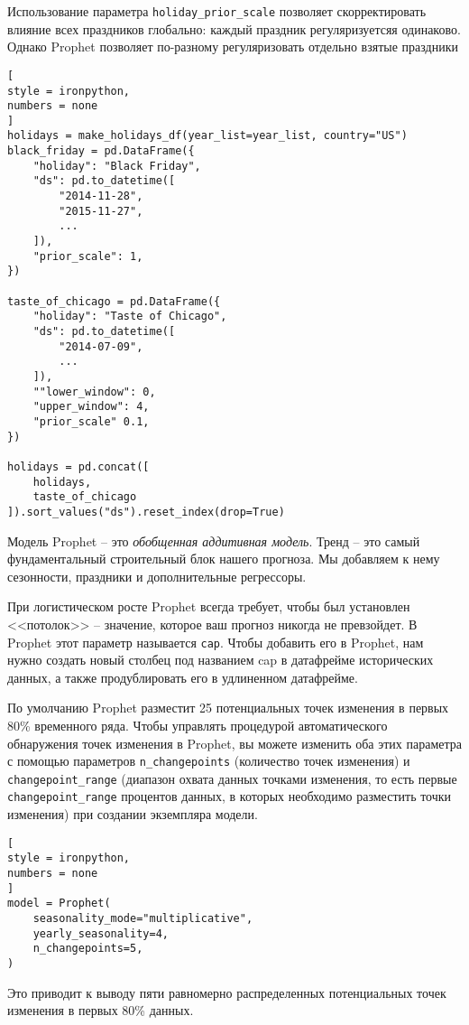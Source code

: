 \documentclass[%
	11pt,
	a4paper,
	utf8,
		]{article}
\begin{document}
Использование параметра \verb|holiday_prior_scale| позволяет скорректировать влияние всех праздников глобально: каждый праздник регуляризуетсяя одинаково. Однако Prophet позволяет по-разному регуляризовать отдельно взятые праздники
\begin{lstlisting}[
style = ironpython,
numbers = none
]
holidays = make_holidays_df(year_list=year_list, country="US")
black_friday = pd.DataFrame({
    "holiday": "Black Friday",
    "ds": pd.to_datetime([
        "2014-11-28",
        "2015-11-27",
        ...
    ]),
    "prior_scale": 1,
})

taste_of_chicago = pd.DataFrame({
    "holiday": "Taste of Chicago",
    "ds": pd.to_datetime([
        "2014-07-09",
        ...
    ]),
    ""lower_window": 0,
    "upper_window": 4,
    "prior_scale" 0.1,
})

holidays = pd.concat([
    holidays,
    taste_of_chicago
]).sort_values("ds").reset_index(drop=True)
\end{lstlisting}

Модель Prophet -- это \emph{обобщенная аддитивная модель}. Тренд -- это самый фундаментальный строительный блок нашего прогноза. Мы добавляем к нему сезонности, праздники и дополнительные регрессоры.

При логистическом росте Prophet всегда требует, чтобы был установлен <<потолок>> -- значение, которое ваш прогноз никогда не превзойдет. В Prophet этот параметр называется \verb|cap|. Чтобы добавить его в Prophet, нам нужно создать новый столбец под названием cap в датафрейме исторических данных, а также продублировать его в удлиненном датафрейме.

По умолчанию Prophet разместит 25 потенциальных точек изменения в первых 80\% временного ряда. Чтобы управлять процедурой автоматического обнаружения точек изменения в Prophet, вы можете изменить оба этих параметра с помощью параметров \verb|n_changepoints| (количество точек изменения) и \verb|changepoint_range| (диапазон охвата данных точками изменения, то есть первые \verb|changepoint_range| процентов данных, в которых необходимо разместить точки изменения) при создании экземпляра модели.
\begin{lstlisting}[
style = ironpython,
numbers = none
]
model = Prophet(
    seasonality_mode="multiplicative",
    yearly_seasonality=4,
    n_changepoints=5,
)
\end{lstlisting}

Это приводит к выводу пяти равномерно распределенных потенциальных точек изменения в первых 80\% данных.
\end{document}
